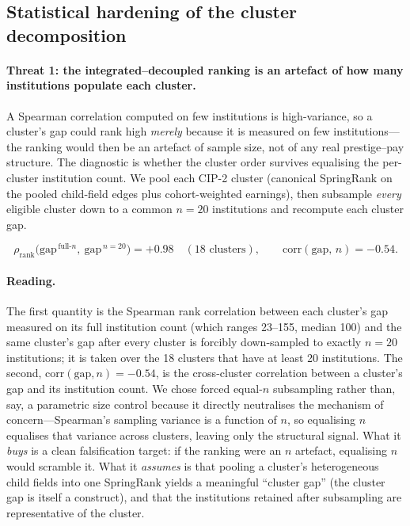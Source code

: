 \documentclass[11pt]{article}
\begin{document}
\subsection{Statistical hardening of the cluster decomposition}

\paragraph{Threat 1: the integrated--decoupled ranking is an artefact of how many institutions populate each cluster.}
A Spearman correlation computed on few institutions is high-variance, so a cluster's gap could rank high \emph{merely} because it is measured on few institutions---the ranking would then be an artefact of sample size, not of any real prestige--pay structure. The diagnostic is whether the cluster order survives equalising the per-cluster institution count. We pool each CIP-2 cluster (canonical SpringRank on the pooled child-field edges plus cohort-weighted earnings), then subsample \emph{every} eligible cluster down to a common $n=20$ institutions and recompute each cluster gap.

\[
\rho_{\text{rank}}\bigl(\text{gap}^{\,\text{full-}n},\ \text{gap}^{\,n=20}\bigr) = +0.98 \quad(\text{18 clusters}), \qquad
\mathrm{corr}(\text{gap},\,n) = -0.54 .
\]

\paragraph{Reading.} The first quantity is the Spearman rank correlation between each cluster's gap measured on its full institution count (which ranges 23--155, median 100) and the same cluster's gap after every cluster is forcibly down-sampled to exactly $n=20$ institutions; it is taken over the 18 clusters that have at least 20 institutions. The second, $\mathrm{corr}(\text{gap},n)=-0.54$, is the cross-cluster correlation between a cluster's gap and its institution count. We chose forced equal-$n$ subsampling rather than, say, a parametric size control because it directly neutralises the mechanism of concern---Spearman's sampling variance is a function of $n$, so equalising $n$ equalises that variance across clusters, leaving only the structural signal. What it \emph{buys} is a clean falsification target: if the ranking were an $n$ artefact, equalising $n$ would scramble it. What it \emph{assumes} is that pooling a cluster's heterogeneous child fields into one SpringRank yields a meaningful ``cluster gap'' (the cluster gap is itself a construct), and that the institutions retained after subsampling are representative of the cluster.
\end{document}
